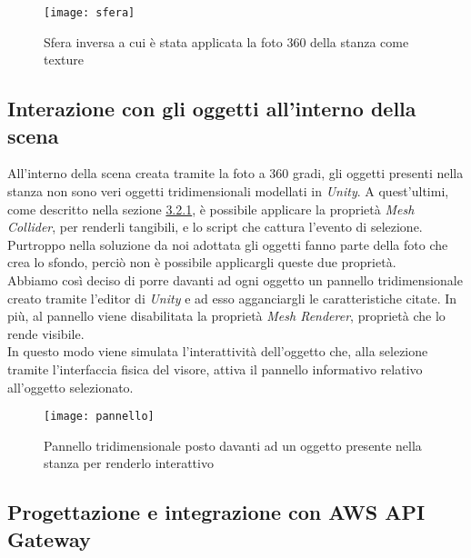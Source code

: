 \label{Sfera}
\begin{figure}[ht]
	\begin{center}
		\texttt{[image: sfera]}
		\caption{Sfera inversa a cui è stata applicata la foto 360 della stanza come texture}
	\end{center}
\end{figure}
\FloatBarrier  

\hypertarget{3.2.4}{\subsection{Interazione con gli oggetti all'interno della scena}} 

All'interno della scena creata tramite la foto a 360 gradi, gli oggetti presenti nella stanza non sono veri oggetti tridimensionali modellati in \textit{Unity}. A quest'ultimi, come descritto nella sezione \hyperlink{3.2.1}{3.2.1}, è possibile applicare la proprietà \textit{Mesh Collider}, per renderli tangibili, e lo script che cattura l'evento di selezione. Purtroppo nella soluzione da noi adottata gli oggetti fanno parte della foto che crea lo sfondo, perciò non è possibile applicargli queste due proprietà. \\
Abbiamo così deciso di porre davanti ad ogni oggetto un pannello tridimensionale creato tramite l'editor di \textit{Unity} e ad esso agganciargli le caratteristiche citate. In più, al pannello viene disabilitata la proprietà \textit{Mesh Renderer}, proprietà che lo rende visibile. \\ 
In questo modo viene simulata l'interattività dell'oggetto che, alla selezione tramite l'interfaccia fisica del visore, attiva il pannello informativo relativo all'oggetto selezionato.

\label{Oggetto Interattivo}
\begin{figure}[ht]
	\begin{center}
		\texttt{[image: pannello]}
		\caption{Pannello tridimensionale posto davanti ad un oggetto presente nella stanza per renderlo interattivo}
	\end{center}
\end{figure}
\FloatBarrier  

\hypertarget{3.2.5}{\subsection{Progettazione e integrazione con AWS API Gateway}}

